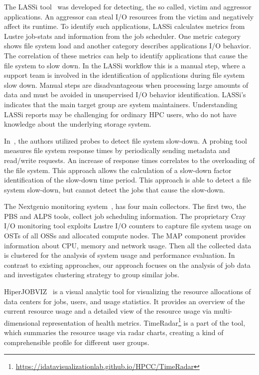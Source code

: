 \documentclass{jhps}
\begin{document}
The LASSi tool~\cite{DBLP:journals/corr/abs-1906-03884} was developed for detecting, the so called, victim and aggressor applications.
An aggressor can steal I/O resources from the victim and negatively affect its runtime.
To identify such applications, LASSi calculates metrics from Lustre job-stats and information from the job scheduler.
One metric category shows file system load and another category describes applications I/O behavior.
The correlation of these metrics can help to identify applications that cause the file system to slow down.
In the LASSi workflow this is a manual step, where a support team is involved in the identification of applications during file system slow down.
Manual steps are disadvantageous when processing large amounts of data and must be avoided in unsupervised I/O behavior identification.
LASSi's indicates that the main target group are system maintainers.
Understanding LASSi reports may be challenging for ordinary HPC users, who do not have knowledge about the underlying storage system.


In~\cite{TUISVPKB19}, the authors utilized probes to detect file system slow-down.
A probing tool measures file system response times by periodically sending metadata and read/write requests.
An increase of response times correlates to the overloading of the file system.
This approach allows the calculation of a slow-down factor identification of the slow-down time period.
This approach is able to detect a file system slow-down, but cannot detect the jobs that cause the slow-down.

The Nextgenio monitoring system~\cite{nextgenio2016}, has four main collectors.
The first two, the PBS and ALPS tools, collect job scheduling information.
The proprietary Cray I/O monitoring tool exploits Lustre I/O counters to capture file system usage on OSTs of all OSSs and allocated compute nodes.
The MAP component provides information about CPU, memory and network usage.
Then all the collected data is clustered for the analysis of system usage and performance evaluation.
In contrast to existing approaches, our approach focuses on the analysis of job data and investigates clustering strategy to group similar jobs.


HiperJOBVIZ~\cite{hiperjobviz2019} is a visual analytic tool for visualizing the resource allocations of data centers for jobs, users, and usage statistics.
It provides an overview of the current resource usage and a detailed view of the resource usage via multi-dimensional representation of health metrics.
TimeRadar\footnote{\url{https://idatavisualizationlab.github.io/HPCC/TimeRadar}} is a part of the tool, which summaries the resource usage via radar charts, creating a kind of comprehensible profile for different user groups.
\end{document}
